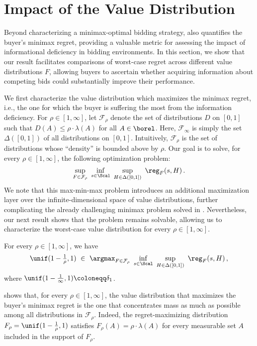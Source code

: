 



\section{Impact of the Value Distribution}\label{sec:value-dist-impact}

Beyond characterizing a minimax-optimal bidding strategy,  also quantifies the buyer’s minimax regret, providing a valuable metric for assessing the impact of informational deficiency in bidding environments. In this section, we show that our result facilitates comparisons of worst-case regret across different value distributions $F$, allowing buyers to ascertain whether acquiring information about competing bids could substantially improve their performance.

We first characterize the value distribution which maximizes the minimax regret, i.e., the one for which the buyer is suffering the most from the information deficiency. 
For $\rho \in [1,\infty]$, let $\mathcal{F}_\rho$ denote the set of distributions $D$ on $[0,1]$ such that $D(A) \leq \rho \cdot \lambda(A)$ for all $A \in \borel$. Here, $\mathcal F_\infty$ is simply the set $\Delta([0,1])$ of all distributions on $[0,1]$. Intuitively, $\mathcal F_\rho$ is the set of distributions whose ``density'' is bounded above by $\rho$.
Our goal is to solve, for every $\rho \in [1,\infty]$, the following optimization problem:
\begin{equation*}
    \sup_{F \in \mathcal{F}_{\rho}}\ \inf_{s \in \Scal}\ \sup_{H \in \Delta([0,1])}\ \reg_F(s,H)\,.
\end{equation*}
We note that this max-min-max problem introduces an additional maximization layer over the infinite-dimensional space of value distributions, further complicating the already challenging minimax problem solved in . Nevertheless, our next result shows that the problem remains solvable, allowing us to characterize the worst-case value distribution for every $\rho \in [1,\infty].$ 
\begin{theorem}\label{thm:worst-value-dist}
	For every $\rho \in [1,\infty]$, we have
	\begin{align*}
		\unif(1 - \tfrac{1}{\rho}, 1)\ \in\ \argmax_{F \in \mathcal F_\rho}\ \inf_{s \in \Scal}\ \sup_{H \in \Delta([0,1])}\ \reg_F(s,H)\,,
	\end{align*}
	where $\unif(1 - \tfrac{1}{\infty},1) \coloneqq \delta_1$.
\end{theorem}
 shows that, for every $\rho \in [1,\infty]$, the value distribution that maximizes the buyer’s minimax regret is the one that concentrates mass as much as possible among all distributions in $\mathcal{F}_{\rho}$. Indeed, the regret-maximizing distribution $F_{\rho} = \unif(1 - \tfrac{1}{\rho}, 1)$ satisfies $F_{\rho}(A) = \rho \cdot \lambda(A)$ for every measurable set $A$ included in the support of $F_{\rho}$. 

